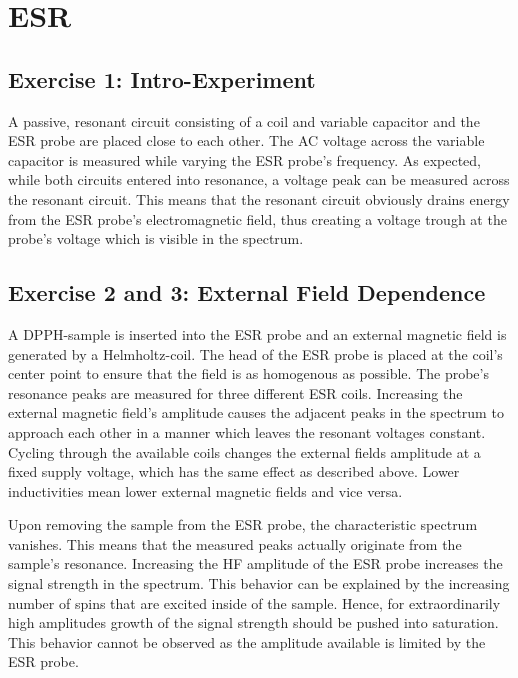 \chapter{ESR}

\section{Exercise 1: Intro-Experiment}
A passive, resonant circuit consisting of a coil and variable capacitor and the ESR probe are placed close to each other.
The AC voltage across the variable capacitor is measured while varying the ESR probe's frequency.
As expected, while both circuits entered into resonance, a voltage peak can be measured across the resonant circuit.
This means that the resonant circuit obviously drains energy from the ESR probe's electromagnetic field, thus creating a voltage trough at the probe's voltage which is visible in the spectrum.

\section{Exercise 2 and 3: External Field Dependence}
A DPPH-sample is inserted into the ESR probe and an external magnetic field is generated by a Helmholtz-coil.
The head of the ESR probe is placed at the coil's center point to ensure that the field is as homogenous as possible.
The probe's resonance peaks are measured for three different ESR coils.
Increasing the external magnetic field's amplitude causes the adjacent peaks in the spectrum to approach each other in a manner which leaves the resonant voltages constant.
Cycling through the available coils changes the external fields amplitude at a fixed supply voltage, which has the same effect as described above.
Lower inductivities mean lower external magnetic fields and vice versa.

Upon removing the sample from the ESR probe, the characteristic spectrum vanishes.
This means that the measured peaks actually originate from the sample's resonance.
Increasing the HF amplitude of the ESR probe increases the signal strength in the spectrum.
This behavior can be explained by the increasing number of spins that are excited inside of the sample.
Hence, for extraordinarily high amplitudes growth of the signal strength should be pushed into saturation.
This behavior cannot be observed as the amplitude available is limited by the ESR probe.

